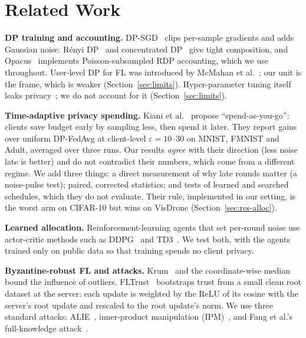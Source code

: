 \documentclass[journal]{IEEEtran}
\newcommand{\eps}{\varepsilon}
\begin{document}
\section{Related Work}
\label{sec:related}

\textbf{DP training and accounting.} DP-SGD~\cite{abadi2016dpsgd} clips per-sample gradients and adds
Gaussian noise. R\'enyi DP~\cite{mironov2017rdp} and concentrated DP~\cite{bun2016zcdp} give tight
composition, and Opacus~\cite{yousefpour2021opacus} implements Poisson-subsampled RDP accounting,
which we use throughout. User-level DP for FL was introduced by McMahan et al.~\cite{mcmahan2018dplm};
our unit is the frame, which is weaker (Section~\ref{sec:limits}). Hyper-parameter tuning itself
leaks privacy~\cite{papernot2022hyperparam}; we do not account for it (Section~\ref{sec:limits}).

\textbf{Time-adaptive privacy spending.} Kiani et al.~\cite{kiani2025timeadaptive} propose
``spend-as-you-go'': clients save budget early by sampling less, then spend it later. They report
gains over uniform DP-FedAvg at client-level $\eps = 10$--$30$ on MNIST, FMNIST and Adult, averaged
over three runs. Our results \emph{agree} with their direction (less noise late is better) and do
not contradict their numbers, which come from a different regime. We add three things: a direct
measurement of why late rounds matter (a noise-pulse test); paired, corrected statistics; and tests
of learned and searched schedules, which they do not evaluate. Their rule, implemented in our
setting, is the worst arm on CIFAR-10 but wins on VisDrone (Section~\ref{sec:res-alloc}).

\textbf{Learned allocation.} Reinforcement-learning agents that set per-round noise use actor-critic
methods such as DDPG~\cite{lillicrap2016ddpg} and TD3~\cite{fujimoto2018td3}. We test both, with the
agents trained only on public data so that training spends no client privacy.

\textbf{Byzantine-robust FL and attacks.} Krum~\cite{blanchard2017krum} and the coordinate-wise
median~\cite{yin2018median} bound the influence of outliers. FLTrust~\cite{cao2021fltrust}
bootstraps trust from a small clean root dataset at the server: each update is weighted by the
ReLU of its cosine with the server's root update and rescaled to the root update's norm. We use
three standard attacks: ALIE~\cite{baruch2019alie}, inner-product manipulation
(IPM)~\cite{xie2019ipm}, and Fang et al.'s full-knowledge attack~\cite{fang2020localpoison}.
\end{document}
